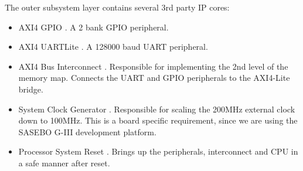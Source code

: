 
The outer subsystem layer contains several 3rd party IP cores:

\begin{itemize}

\item AXI4 GPIO \cite{SCARV:XILINX:GPIO}.
    A 2 bank GPIO peripheral.

\item AXI4 UARTLite \cite{SCARV:XILINX:UART-Lite}.
    A 128000 baud UART peripheral.

\item AXI4 Bus Interconnect \cite{SCARV:XILINX:AXI-IC}.
    Responsible for implementing the 2nd level of the memory map.
    Connects the UART and GPIO peripherals to the AXI4-Lite bridge.

\item System Clock Generator \cite{SCARV:XILINX:ClockingWizard}.
    Responsible for scaling the 200MHz external clock down to
    100MHz.
    This is a board specific requirement, since we are using the
    SASEBO G-III development platform.

\item Processor System Reset \cite{SCARV:XILINX:ProcessorReset}.
    Brings up the peripherals, interconnect and CPU in a safe
    manner after reset.

\end{itemize}
